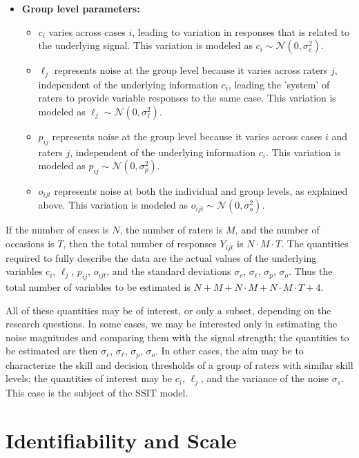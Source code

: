 \documentclass[num-refs]{wiley-article}
\begin{document}
\begin{itemize}
\begin{itemize}
    \end{itemize}
    \item \textbf{Group level parameters:}
    \begin{itemize}
        \item $c_i$ varies across cases $i$, leading to variation in responses that is related to the underlying signal. This variation is modeled as $c_i \sim \mathcal{N}(0,\sigma_c^2)$.
        \item $\ell_j$ represents noise at the group level because it varies across raters $j$, independent of the underlying information $c_i$, leading the 'system' of raters to provide variable responses to the same case. This variation is modeled as $\ell_j \sim \mathcal{N}(0,\sigma_\ell^2)$.
        \item $p_{ij}$ represents noise at the group level because it varies across cases $i$ and raters $j$, independent of the underlying information $c_i$. This variation is modeled as $p_{ij} \sim \mathcal{N}(0,\sigma_p^2)$.
        \item $o_{ijt}$ represents noise at both the individual and group levels, as explained above. This variation is modeled as $o_{ijt} \sim \mathcal{N}(0,\sigma_o^2)$.
    \end{itemize}
\end{itemize}

If the number of cases is $N$, the number of raters is $M$, and the number of occasions is $T$, then the total number of responses $Y_{ijt}$ is $N \cdot M \cdot T$. The quantities required to fully describe the data are the actual values of the underlying variables $c_i$, $\ell_j$, $p_{ij}$, $o_{ijt}$, and the standard deviations $\sigma_c$, $\sigma_\ell$, $\sigma_p$, $\sigma_o$. Thus the total number of variables to be estimated is $N + M + N \cdot M + N \cdot M \cdot T + 4$.

All of these quantities may be of interest, or only a subset, depending on the research questions. In some cases, we may be interested only in estimating the noise magnitudes and comparing them with the signal strength; the quantities to be estimated are then $\sigma_c$, $\sigma_\ell$, $\sigma_p$, $\sigma_o$. In other cases, the aim may be to characterize the skill and decision thresholds of a group of raters with similar skill levels; the quantities of interest may be $c_i$, $\ell_j$, and the variance of the noise $\sigma_s$. This case is the subject of the SSIT model.

\section*{Identifiability and Scale}\label{section-identifiability}
\end{document}

